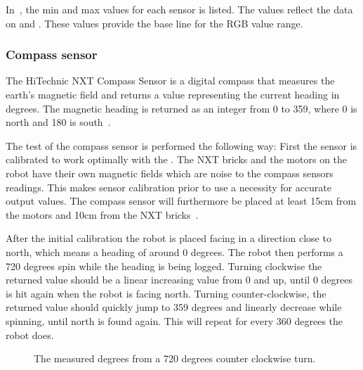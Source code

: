 In~, the min and max values for each sensor is listed. The values reflect the data on  and . These values provide the base line for the RGB value range.


\subsubsection{Compass sensor}
The HiTechnic NXT Compass Sensor is a digital compass that measures the earth's magnetic field and returns a value representing the current heading in degrees. The magnetic heading is returned as an integer from 0 to 359, where 0 is north and 180 is south~\citep{compass}.

The test of the compass sensor is performed the following way: First the sensor is calibrated to work optimally with the \projname{}. The NXT bricks and the motors on the robot have their own magnetic fields which are noise to the compass sensors readings. This makes sensor calibration prior to use a necessity for accurate output values. The compass sensor will furthermore be placed at least 15cm from the motors and 10cm from the NXT bricks~\citep{compass}.

After the initial calibration the robot is placed facing in a direction close to north, which means a heading of around 0 degrees. The robot then performs a 720 degrees spin while the heading is being logged. Turning clockwise the returned value should be a linear increasing value from 0 and up, until 0 degrees is hit again when the robot is facing north. Turning counter-clockwise, the returned value should quickly jump to 359 degrees and linearly decrease while spinning, until north is found again. This will repeat for every 360 degrees the robot does. 

\begin{figure}[H]
     \caption{\label{fig:compass_sensor_test_graph} The measured degrees from a 720 degrees counter clockwise turn.}
\end{figure}

